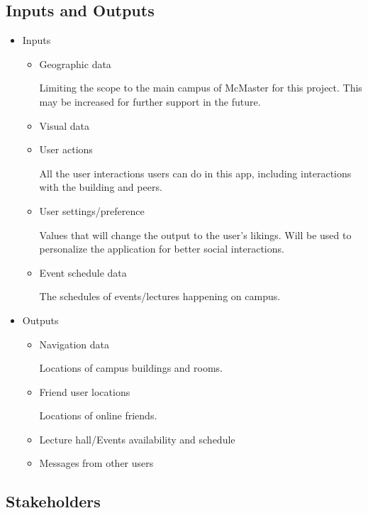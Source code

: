 \documentclass{article}
\begin{document}
\subsection{Inputs and Outputs}
\begin{itemize}
    \item Inputs
    \begin{itemize}
        \item Geographic data

        \quad Limiting the scope to the main campus of McMaster for this project. This may be increased for further support in the future.

        \item Visual data
        \item User actions 

        \quad All the user interactions users can do in this app, including interactions with the building and peers.

        \item User settings/preference

        \quad Values that will change the output to the user's likings. Will be used to personalize the application for better social interactions.
        
        \item Event schedule data 

        \quad The schedules of events/lectures happening on campus.

    \end{itemize}
    \item Outputs
    \begin{itemize}
        \item Navigation data
        
        \quad Locations of campus buildings and rooms.
        
        \item Friend user locations

        \quad Locations of online friends.
        
        \item Lecture hall/Events availability and schedule
        \item Messages from other users
    \end{itemize}
\end{itemize}


\subsection{Stakeholders}
\end{document}
